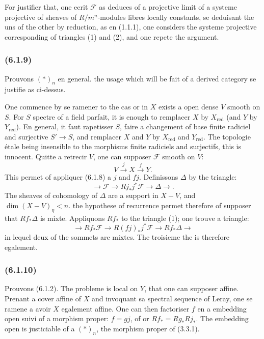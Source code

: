 \documentclass[12pt,a4paper]{article}
\theoremstyle{plain}
\theoremstyle{definition}
\theoremstyle{remark}
\newcommand{\red}{\mathrm{red}}
\newcommand{\scrF}{\mathscr{F}}
\begin{document}
For justifier that, one ecrit $\scrF$ as deduces of a projective limit of a systeme projective of sheaves of $R/m^n$-modules libres locally constants, se deduisant the uns of the other by reduction, as en (1.1.1), one considers the systeme projective corresponding of triangles (1) and (2), and one repete the argument.

\subsubsection*{\textup{(6.1.9)}}

Prouvons $(*)_n$ en general. the usage which will be fait of a derived category se justifie as ci-dessus.

One commence by se ramener to the cas or in $X$ exists a open dense $V$ smooth on $S$. For $S$ spectre of a field parfait, it is enough to remplacer $X$ by $X_{\red}$ (and $Y$ by $Y_{\red}$). En general, it faut rapetisser $S$, faire a changement of base finite radiciel and surjective $S' \to S$, and remplacer $X$ and $Y$ by $X_{\red}$ and $Y_{\red}$. The topologie étale being insensible to the morphisms finite radiciels and surjectifs, this is innocent. Quitte a retrecir $V$, one can supposer $\scrF$ smooth on $V$:
\[
V \xrightarrow{j} X \xrightarrow{f} Y.
\]
This permet of appliquer (6.1.8) a $j$ and $fj$. Definissons $\Delta$ by the triangle:
\begin{equation}
\to \scrF \to Rj_* j^* \scrF \to \Delta \to.
\end{equation}
The sheaves of cohomology of $\Delta$ are a support in $X - V$, and $\dim(X - V)_\eta < n$. the hypothese of recurrence permet therefore of supposer that $Rf_* \Delta$ is mixte. Appliquons $Rf_*$ to the triangle (1); one trouve a triangle:
\[
\to Rf_* \scrF \to R(fj)_* j^* \scrF \to Rf_* \Delta \to
\]
in lequel deux of the sommets are mixtes. The troisieme the is therefore egalement.

\subsubsection*{\textup{(6.1.10)}}

Prouvons (6.1.2). The probleme is local on $Y$, that one can supposer affine. Prenant a cover affine of $X$ and invoquant sa spectral sequence of Leray, one se ramene a avoir $X$ egalement affine. One can then factoriser $f$ en a embedding open suivi of a morphism proper: $f = gj$, of or $Rf_* = Rg_* Rj_*$. The embedding open is justiciable of a $(*)_n$, the morphism proper of (3.3.1).
\end{document}
